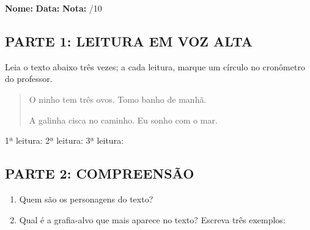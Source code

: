 \begin{exercicio}

\noindent\textbf{Nome:} \underline{\hspace{3.2cm}} \quad \textbf{Data:} \underline{\hspace{1.6cm}} \quad \textbf{Nota:} \underline{\hspace{0.9cm}}/10


\subsection*{PARTE 1: LEITURA EM VOZ ALTA}

Leia o texto abaixo três vezes; a cada leitura, marque um círculo no cronômetro do professor.

\begin{quote}
O ninho tem três ovos. Tomo banho de manhã.

A galinha cisca no caminho. Eu sonho com o mar.
\end{quote}

\begin{center}
1ª leitura: \underline{\hspace{1.5cm}} \quad 2ª leitura: \underline{\hspace{1.5cm}} \quad 3ª leitura: \underline{\hspace{1.5cm}}
\end{center}

\subsection*{PARTE 2: COMPREENSÃO}

\begin{enumerate}

  \item Quem são os personagens do texto?
  \begin{center}
  \underline{\hspace{12cm}}
  \end{center}

  \item Qual é a grafia-alvo que mais aparece no texto? Escreva três exemplos:
  \begin{center}
  \underline{\hspace{3.5cm}} \quad \underline{\hspace{3.5cm}} \quad \underline{\hspace{3.5cm}}
  \end{center}


\end{enumerate}
\end{exercicio}
